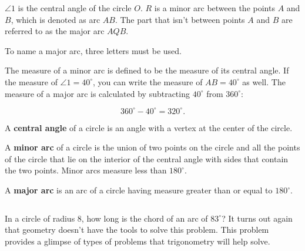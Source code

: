 $\angle 1$ is the central angle of the circle $O$. $R$ is a minor arc between
the points $A$ and $B$, which is denoted as arc $AB$. The part that isn't
between points $A$ and $B$ are referred to as the major arc $AQB$.

\begin{note}
	To name a major arc, three letters must be used.
\end{note}

The measure of a minor arc is defined to be the measure of its central angle.
If the measure of $\angle 1 = 40^{\circ}$, you can write the measure of $AB =
	40^{\circ}$ as well. The measure of a major arc is calculated by subtracting
$40^{\circ}$ from $360^{\circ}$:

\[ 360^{\circ} - 40^{\circ} = 320^{\circ} . \]

\begin{definition}
	\label{def:central_angle}

	A \textbf{central angle} of a circle is an angle with a vertex at the center
	of the circle.
\end{definition}

\begin{definition}
	\label{def:minor_arcj}

	A \textbf{minor arc} of a circle is the union of two points on the circle and
	all the points of the circle that lie on the interior of the central angle
	with sides that contain the two points. Minor arcs measure less than
	$180^{\circ}$.
\end{definition}

\begin{definition}
	\label{def:major_arc}

	A \textbf{major arc} is an arc of a circle having measure greater than or
	equal to $180^{\circ}$.
\end{definition}

\begin{example}
	\label{exm:angles_and_arcs_of_a_circle}$ $

	\begin{figure}[H]
		\centering


		\label{fig:angles_and_arcs_of_a_circle}
	\end{figure}

	In a circle of radius $8$, how long is the chord of an arc of $83^{\circ}$?
	It turns out again that geometry doesn't have the tools to solve this
	problem. This problem provides a glimpse of types of problems that
	trigonometry will help solve.
\end{example}

